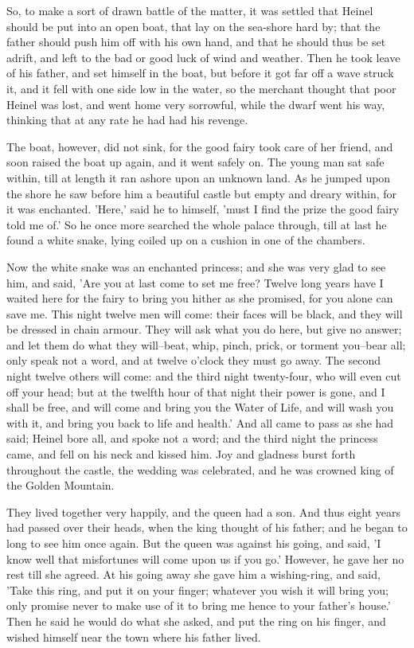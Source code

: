 \documentclass[12pt]{book}
\begin{document}
So, to make a sort of drawn battle of the matter, it was settled that
Heinel should be put into an open boat, that lay on the sea-shore hard
by; that the father should push him off with his own hand, and that he
should thus be set adrift, and left to the bad or good luck of wind
and weather. Then he took leave of his father, and set himself in the
boat, but before it got far off a wave struck it, and it fell with one
side low in the water, so the merchant thought that poor Heinel was
lost, and went home very sorrowful, while the dwarf went his way,
thinking that at any rate he had had his revenge.

The boat, however, did not sink, for the good fairy took care of her
friend, and soon raised the boat up again, and it went safely on. The
young man sat safe within, till at length it ran ashore upon an
unknown land. As he jumped upon the shore he saw before him a
beautiful castle but empty and dreary within, for it was enchanted.
'Here,' said he to himself, 'must I find the prize the good fairy told
me of.' So he once more searched the whole palace through, till at
last he found a white snake, lying coiled up on a cushion in one of
the chambers.

Now the white snake was an enchanted princess; and she was very glad
to see him, and said, 'Are you at last come to set me free? Twelve
long years have I waited here for the fairy to bring you hither as she
promised, for you alone can save me. This night twelve men will come:
their faces will be black, and they will be dressed in chain armour.
They will ask what you do here, but give no answer; and let them do
what they will--beat, whip, pinch, prick, or torment you--bear all;
only speak not a word, and at twelve o'clock they must go away. The
second night twelve others will come: and the third night twenty-four,
who will even cut off your head; but at the twelfth hour of that night
their power is gone, and I shall be free, and will come and bring you
the Water of Life, and will wash you with it, and bring you back to
life and health.' And all came to pass as she had said; Heinel bore
all, and spoke not a word; and the third night the princess came, and
fell on his neck and kissed him. Joy and gladness burst forth
throughout the castle, the wedding was celebrated, and he was crowned
king of the Golden Mountain.

They lived together very happily, and the queen had a son. And thus
eight years had passed over their heads, when the king thought of his
father; and he began to long to see him once again. But the queen was
against his going, and said, 'I know well that misfortunes will come
upon us if you go.' However, he gave her no rest till she agreed. At
his going away she gave him a wishing-ring, and said, 'Take this ring,
and put it on your finger; whatever you wish it will bring you; only
promise never to make use of it to bring me hence to your father's
house.' Then he said he would do what she asked, and put the ring on
his finger, and wished himself near the town where his father lived.
\end{document}
